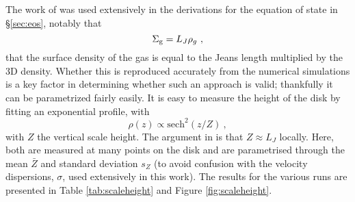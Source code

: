 The work of \citet{schaye_model-independent_2001} was used extensively in the derivations for the equation of state in \S \ref{sec:eos}, notably that
$$
    \Sigma_\mathrm{g} = L_J \rho_g~,
$$
that the surface density of the gas is equal to the Jeans length multiplied by the 3D density.
Whether this is reproduced accurately from the numerical simulations is a key factor in determining whether such an approach is valid; thankfully it can be parametrized fairly easily.
It is easy to measure the height of the disk by fitting an exponential profile, with
$$
    \rho(z) \propto \mathrm{sech}^2\left(z/Z\right)~,
$$
with $Z$ the vertical scale height.
The argument in \citet{schaye_model-independent_2001} is that $Z \approx L_J$ locally.
Here, both are measured at many points on the disk and are parametrised through the mean $\bar{Z}$ and standard deviation $s_Z$ (to avoid confusion with the velocity dispersions, $\sigma$, used extensively in this work).
The results for the various runs are presented in Table \ref{tab:scaleheight} and Figure \ref{fig:scaleheight}.
